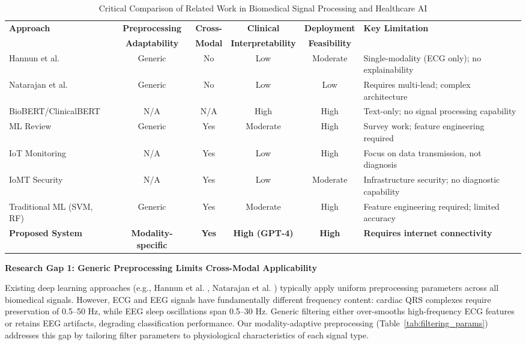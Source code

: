 \documentclass[conference]{IEEEtran}
\begin{document}
\begin{table}[htbp]
\caption{Critical Comparison of Related Work in Biomedical Signal Processing and Healthcare AI}
\label{tab:comparison}
\centering
\begin{tabular}{p{3.5cm}ccccl}
\toprule
\textbf{Approach} & \textbf{Preprocessing} & \textbf{Cross-} & \textbf{Clinical} & \textbf{Deployment} & \textbf{Key Limitation} \\
 & \textbf{Adaptability} & \textbf{Modal} & \textbf{Interpretability} & \textbf{Feasibility} & \\
\midrule
Hannun et al. \cite{hannun2019} & Generic & No & Low & Moderate & Single-modality (ECG only); no explainability \\
Natarajan et al. \cite{natarajan2020} & Generic & No & Low & Low & Requires multi-lead; complex architecture \\
BioBERT/ClinicalBERT \cite{lee2020} & N/A & N/A & High & High & Text-only; no signal processing capability \\
ML Review \cite{ml_healthcare_review2021} & Generic & Yes & Moderate & High & Survey work; feature engineering required \\
IoT Monitoring \cite{iot_fog2020} & N/A & Yes & Low & High & Focus on data transmission, not diagnosis \\
IoMT Security \cite{iot_security2021,blockchain_iomt2020} & N/A & Yes & Low & Moderate & Infrastructure security; no diagnostic capability \\
Traditional ML (SVM, RF) & Generic & Yes & Moderate & High & Feature engineering required; limited accuracy \\
\midrule
\textbf{Proposed System} & \textbf{Modality-specific} & \textbf{Yes} & \textbf{High (GPT-4)} & \textbf{High} & \textbf{Requires internet connectivity} \\
\bottomrule
\end{tabular}
\end{table}

\textbf{Research Gap 1: Generic Preprocessing Limits Cross-Modal Applicability}

Existing deep learning approaches (e.g., Hannun et al. \cite{hannun2019}, Natarajan et al. \cite{natarajan2020}) typically apply uniform preprocessing parameters across all biomedical signals. However, ECG and EEG signals have fundamentally different frequency content: cardiac QRS complexes require preservation of 0.5--50 Hz, while EEG sleep oscillations span 0.5--30 Hz. Generic filtering either over-smooths high-frequency ECG features or retains EEG artifacts, degrading classification performance. Our modality-adaptive preprocessing (Table~\ref{tab:filtering_params}) addresses this gap by tailoring filter parameters to physiological characteristics of each signal type.
\end{document}
